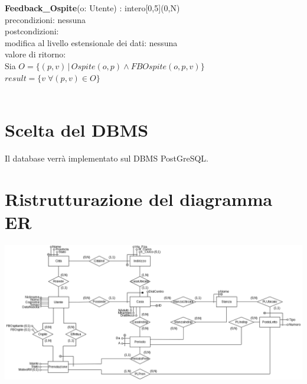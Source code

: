 \documentclass[a4paper,12pt]{report}
\begin{document}
        \hspace*{-1cm}
        \textbf{Feedback\_Ospite}(o: Utente) : intero[0,5](0,N) \\
        \hspace*{1cm} precondizioni: nessuna \\
        \hspace*{1cm} postcondizioni: \\
        \hspace*{2cm} modifica al livello estensionale dei dati: nessuna \\
        \hspace*{2cm} valore di ritorno: \\
        \hspace*{3cm} Sia $O = \{(p, v) \, | \, Ospite(o, p) \wedge FBOspite(o, p, v)\}$ \\
        \hspace*{3cm} $result = \{v \; \forall (p, v) \in O\}$ \\ \\

    \chapter{Scelta del DBMS}
      Il database verrà implementato sul DBMS PostGreSQL.

    \chapter{Ristrutturazione del diagramma ER}
      \includegraphics[width=1\textwidth]{er_ristr.png}
\end{document}
